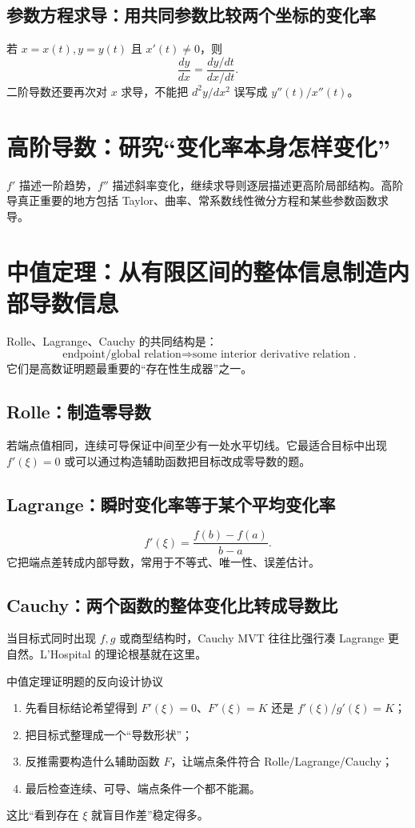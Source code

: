 \documentclass[11pt,a4paper,openany]{ctexbook}
\begin{document}
\subsection{参数方程求导：用共同参数比较两个坐标的变化率}
若 $x=x(t),y=y(t)$ 且 $x'(t)\neq0$，则
\[
\frac{dy}{dx}=\frac{dy/dt}{dx/dt}.
\]
二阶导数还要再次对 $x$ 求导，不能把 $d^2y/dx^2$ 误写成 $y''(t)/x''(t)$。

\section{高阶导数：研究“变化率本身怎样变化”}
$f'$ 描述一阶趋势，$f''$ 描述斜率变化，继续求导则逐层描述更高阶局部结构。高阶导真正重要的地方包括 Taylor、曲率、常系数线性微分方程和某些参数函数求导。

\section{中值定理：从有限区间的整体信息制造内部导数信息}
Rolle、Lagrange、Cauchy 的共同结构是：
\[
\boxed{\text{endpoint/global relation}\Longrightarrow \text{some interior derivative relation}}.
\]
它们是高数证明题最重要的“存在性生成器”之一。

\subsection{Rolle：制造零导数}
若端点值相同，连续可导保证中间至少有一处水平切线。它最适合目标中出现 $f'(\xi)=0$ 或可以通过构造辅助函数把目标改成零导数的题。

\subsection{Lagrange：瞬时变化率等于某个平均变化率}
\[
f'(\xi)=\frac{f(b)-f(a)}{b-a}.
\]
它把端点差转成内部导数，常用于不等式、唯一性、误差估计。

\subsection{Cauchy：两个函数的整体变化比转成导数比}
当目标式同时出现 $f,g$ 或商型结构时，Cauchy MVT 往往比强行凑 Lagrange 更自然。L'Hospital 的理论根基就在这里。

\begin{methodbox}{中值定理证明题的反向设计协议}
\begin{enumerate}
  \item 先看目标结论希望得到 $F'(\xi)=0$、$F'(\xi)=K$ 还是 $f'(\xi)/g'(\xi)=K$；
  \item 把目标式整理成一个“导数形状”；
  \item 反推需要构造什么辅助函数 $F$，让端点条件符合 Rolle/Lagrange/Cauchy；
  \item 最后检查连续、可导、端点条件一个都不能漏。
\end{enumerate}
这比“看到存在 $\xi$ 就盲目作差”稳定得多。
\end{methodbox}
\end{document}

